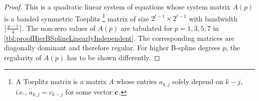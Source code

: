 \begin{proof}
  This is a quadratic linear system of equations
  whose system matrix
  $A(p)$ is a banded symmetric Toeplitz%
  \footnote{%
    A Toeplitz matrix is a matrix $A$ whose entries $a_{k,j}$
    solely depend on $k - j$, i.e.,
    $a_{k,j} = c_{k-j}$ for some vector ${\boldsymbol{c}}$.%
  }
  matrix of size
  $2^{l-1} \times 2^{l-1}$ with bandwidth $\lceil\tfrac{p-1}{4}\rceil$.
  The non-zero values of $A(p)$ are tabulated for $p = 1, 3, 5, 7$
  in \cref{tbl:proofHierBSplineLinearlyIndependent}.
  The corresponding matrices are diagonally dominant and therefore regular.
  For higher B-spline degrees $p$, the regularity of $A(p)$ has
  to be shown differently.
  

\end{proof}
